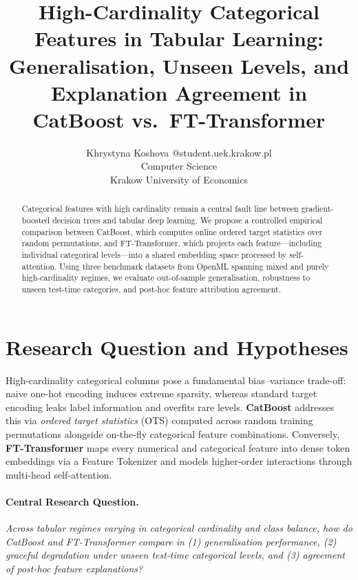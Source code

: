 \documentclass[twoside,11pt]{article}
\begin{document}
\title{High-Cardinality Categorical Features in Tabular Learning: Generalisation, Unseen Levels, and Explanation Agreement in CatBoost vs.\ FT-Transformer}

\author{\name Khrystyna Koshova @student.uek.krakow.pl \\
       \addr Computer Science\\
       Krakow University of Economics}

\maketitle

\begin{abstract}%
Categorical features with high cardinality remain a central fault line between gradient-boosted decision trees and tabular deep learning. We propose a controlled empirical comparison between CatBoost, which computes online ordered target statistics over random permutations, and FT-Transformer, which projects each feature—including individual categorical levels—into a shared embedding space processed by self-attention. Using three benchmark datasets from OpenML spanning mixed and purely high-cardinality regimes, we evaluate out-of-sample generalisation, robustness to unseen test-time categories, and post-hoc feature attribution agreement.
\end{abstract}

\section{Research Question and Hypotheses}
High-cardinality categorical columns pose a fundamental bias--variance trade-off: naive one-hot encoding induces extreme sparsity, whereas standard target encoding leaks label information and overfits rare levels. \textbf{CatBoost} \citep{prokhorenkova2018catboost} addresses this via \emph{ordered target statistics} (OTS) computed across random training permutations alongside on-the-fly categorical feature combinations. Conversely, \textbf{FT-Transformer} \citep{gorishniy2021revisiting} maps every numerical and categorical feature into dense token embeddings via a Feature Tokenizer and models higher-order interactions through multi-head self-attention.

\paragraph{Central Research Question.}
\emph{Across tabular regimes varying in categorical cardinality and class balance, how do CatBoost and FT-Transformer compare in (1) generalisation performance, (2) graceful degradation under unseen test-time categorical levels, and (3) agreement of post-hoc feature explanations?}
\end{document}
